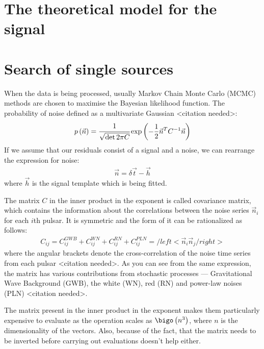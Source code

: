 \documentclass{scrreprt}
\begin{document}
    \section{The theoretical model for the signal}


    \section{Search of single sources}

    When the data is being processed, usually Markov Chain Monte Carlo (MCMC)
    methods are chosen to maximise the Bayesian likelihood function.
    The probability of noise defined as a multivariate Gaussian <citation
    needed>:
    \begin{align}
        p \left( \vec{n} \right) = \cfrac{1}{\sqrt{\det 2\pi C}}
        \exp{\left( - \frac{1}{2} \vec{n}^{T} C^{-1} \vec{n} \right) }
    \end{align}
    If we assume that our residuals consist of a signal and a noise, we can
    rearrange the expression for noise:
    \begin{align}
        \vec{n} = \delta \vec{t} - \vec{h}
    \end{align}
    where $\vec{h}$ is the signal template which is being fitted.

    The matrix $C$ in the inner product in the exponent is called covariance
    matrix, which contains the information about the correlations between the
    noise series $\vec{n}_i$ for each $i$th pulsar.
    It is symmetric and the form of it can be rationalized as follows:
    \begin{align}
        C_{ij} = C^{GWB}_{ij} + C^{WN}_{ij} + C^{RN}_{ij} + C^{PLN}_{ij} =
        /left< \vec{n}_i \vec{n}_j /right>
    \end{align}
    where the angular brackets denote the cross-correlation of the noise time
    series from each pulsar <citation needed>.
    As you can see from the same expression, the matrix has various contributions
    from stochastic processes --- Gravitational Wave Background (GWB), the white
    (WN), red (RN) and power-law noises (PLN) <citation needed>.

    The matrix present in the inner product in the exponent makes them
    particularly expensive to evaluate as the operation scales as $\bigo \left(
    n^{3} \right)$, where $n$ is the dimensionality of the vectors.
    Also, because of the fact, that the matrix needs to be inverted before
    carrying out evaluations doesn't help either.
\end{document}

